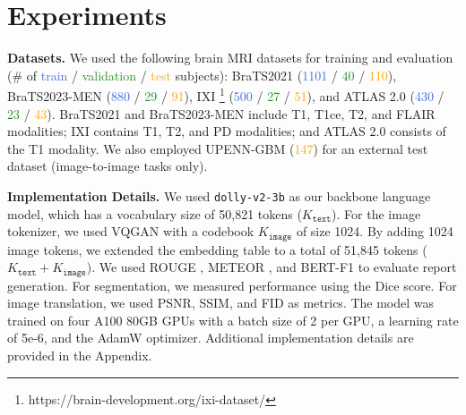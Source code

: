\section{Experiments}

\noindent \textbf{Datasets.} We used the following brain MRI datasets for training and evaluation (\# of \textcolor{RoyalBlue}{train} / \textcolor{ForestGreen}{validation} / \textcolor{Orange}{test} subjects): BraTS2021 \cite{baid2021rsna} (\textcolor{RoyalBlue}{1101} / \textcolor{ForestGreen}{40} / \textcolor{Orange}{110}), BraTS2023-MEN \cite{labella2023asnrmiccai} (\textcolor{RoyalBlue}{880} / \textcolor{ForestGreen}{29} / \textcolor{Orange}{91}), IXI \footnote{https://brain-development.org/ixi-dataset/} (\textcolor{RoyalBlue}{500} / \textcolor{ForestGreen}{27} / \textcolor{Orange}{51}), and ATLAS 2.0 \cite{liew2022large} (\textcolor{RoyalBlue}{430} / \textcolor{ForestGreen}{23} / \textcolor{Orange}{43}). BraTS2021 and BraTS2023-MEN include T1, T1ce, T2, and FLAIR modalities; IXI contains T1, T2, and PD modalities; and ATLAS 2.0 consists of the T1 modality. We also employed UPENN-GBM \cite{bakas2021multi} (\textcolor{Orange}{147}) for an external test dataset (image-to-image tasks only).

\vspace{3pt}
\noindent \textbf{Implementation Details.} We used \texttt{dolly-v2-3b} \cite{conover2023free} as our backbone language model, which has a vocabulary size of 50,821 tokens ($K_\texttt{text}$). For the image tokenizer, we used VQGAN \cite{esser2021taming} with a codebook $K_\texttt{image}$ of size 1024. By adding 1024 image tokens, we extended the embedding table to a total of 51,845 tokens ($K_\texttt{text} + K_\texttt{image}$). We used ROUGE \cite{lin-2004-rouge}, METEOR \cite{banerjee-lavie-2005-meteor}, and BERT-F1 \cite{Zhang2020BERTScore} to evaluate report generation. For segmentation, we measured performance using the Dice score. For image translation, we used PSNR, SSIM, and FID \cite{heusel2017gans} as metrics. The model was trained on four A100 80GB GPUs with a batch size of 2 per GPU, a learning rate of 5e-6, and the AdamW \cite{loshchilov2018decoupled} optimizer. Additional implementation details are provided in the Appendix.


